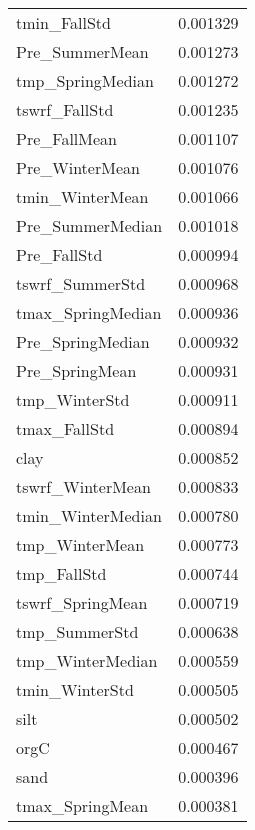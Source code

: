 \begin{tabular}{lr}
tmin_FallStd & 0.001329 \\
Pre_SummerMean & 0.001273 \\
tmp_SpringMedian & 0.001272 \\
tswrf_FallStd & 0.001235 \\
Pre_FallMean & 0.001107 \\
Pre_WinterMean & 0.001076 \\
tmin_WinterMean & 0.001066 \\
Pre_SummerMedian & 0.001018 \\
Pre_FallStd & 0.000994 \\
tswrf_SummerStd & 0.000968 \\
tmax_SpringMedian & 0.000936 \\
Pre_SpringMedian & 0.000932 \\
Pre_SpringMean & 0.000931 \\
tmp_WinterStd & 0.000911 \\
tmax_FallStd & 0.000894 \\
clay & 0.000852 \\
tswrf_WinterMean & 0.000833 \\
tmin_WinterMedian & 0.000780 \\
tmp_WinterMean & 0.000773 \\
tmp_FallStd & 0.000744 \\
tswrf_SpringMean & 0.000719 \\
tmp_SummerStd & 0.000638 \\
tmp_WinterMedian & 0.000559 \\
tmin_WinterStd & 0.000505 \\
silt & 0.000502 \\
orgC & 0.000467 \\
sand & 0.000396 \\
tmax_SpringMean & 0.000381 \\
\bottomrule
\end{tabular}
